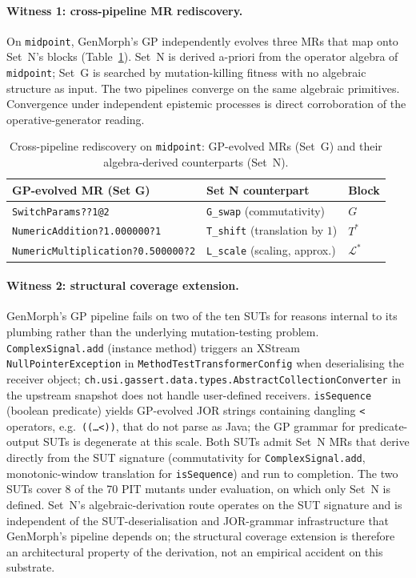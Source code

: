 \paragraph{Witness 1: cross-pipeline MR rediscovery.}
On \texttt{midpoint}, GenMorph's GP independently evolves three MRs
that map onto Set~N's blocks (Table~\ref{tab:rediscovery}). Set~N is
derived a-priori from the operator algebra of \texttt{midpoint};
Set~G is searched by mutation-killing fitness with no algebraic
structure as input. The two pipelines converge on the same algebraic
primitives. Convergence under independent epistemic processes is
direct corroboration of the operative-generator reading.

\begin{table}[h]
\centering
\caption{Cross-pipeline rediscovery on \texttt{midpoint}: GP-evolved
MRs (Set~G) and their algebra-derived counterparts (Set~N).}
\label{tab:rediscovery}
\small
\begin{tabular}{lll}
\toprule
GP-evolved MR (Set G) & Set N counterpart & Block \\
\midrule
\texttt{SwitchParams??1@2}                & \texttt{G\_swap} (commutativity)         & $G$ \\
\texttt{NumericAddition?1.000000?1}       & \texttt{T\_shift} (translation by $1$)   & $T^{*}$ \\
\texttt{NumericMultiplication?0.500000?2} & \texttt{L\_scale} (scaling, approx.)     & $\mathcal{L}^{*}$ \\
\bottomrule
\end{tabular}
\end{table}

\paragraph{Witness 2: structural coverage extension.}
GenMorph's GP pipeline fails on two of the ten SUTs for reasons
internal to its plumbing rather than the underlying mutation-testing
problem. \texttt{ComplexSignal.add} (instance method) triggers an
XStream \texttt{NullPointerException} in
\texttt{MethodTestTransformerConfig} when deserialising the receiver
object;
\texttt{ch.usi.gassert.data.types.AbstractCollectionConverter} in the
upstream snapshot does not handle user-defined receivers.
\texttt{isSequence} (boolean predicate) yields GP-evolved JOR strings
containing dangling \texttt{<} operators, e.g.\ \texttt{((\ldots <))},
that do not parse as Java; the GP grammar for predicate-output SUTs
is degenerate at this scale. Both SUTs admit Set~N MRs that derive
directly from the SUT signature (commutativity for
\texttt{ComplexSignal.add}, monotonic-window translation for
\texttt{isSequence}) and run to completion. The two SUTs cover 8 of
the 70 PIT mutants under evaluation, on which only Set~N is defined.
Set~N's algebraic-derivation route operates on the SUT signature and
is independent of the SUT-deserialisation and JOR-grammar
infrastructure that GenMorph's pipeline depends on; the structural
coverage extension is therefore an architectural property of the
derivation, not an empirical accident on this substrate.

